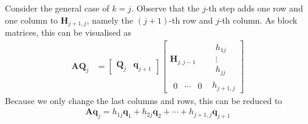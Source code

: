 \documentclass[12pt,a4paper]{article} %
\begin{document}
Consider the general case of $k=j$. Observe that the $j$-th step adds 
one row and one column to $\mathbf H_{j+1,j}$, namely the $(j+1)$-th row and $j$-th 
column. As block matrices, this can be visualised as 
\begin{align*}
    \mathbf A \mathbf Q_j &= \begin{bmatrix}
        \mathbf Q_j & \bm q_{j+1}
    \end{bmatrix}
    \begin{bmatrix}
        \mathbf H_{j,j-1} & \begin{matrix}
            h_{1j} \\ \vdots \\ h_{jj}
        \end{matrix} \\ 
        \begin{matrix}
            0 & \cdots & 0
        \end{matrix} & h_{j+1,j}
    \end{bmatrix}
\end{align*}
Because we only change the last columns and rows, this can be reduced to 
\begin{align*}
    \mathbf A \bm q_j = h_{1j}\bm q_1 + h_{2j} \bm q_2 + \cdots + h_{j+1,j}\bm q_{j+1}
\end{align*}
\end{document}

